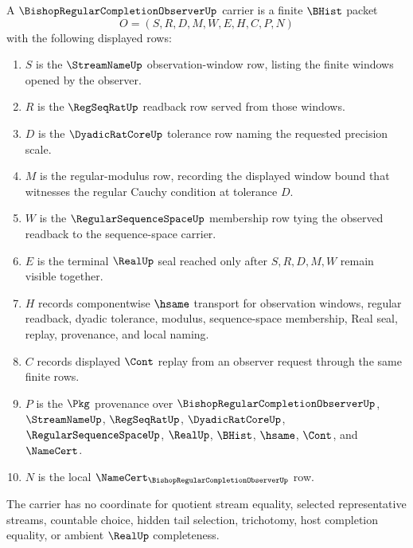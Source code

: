 \begin{definition}
\label{def:bishop-regular-completion-observer-carrier}
A $\BishopRegularCompletionObserverUp$ carrier is a finite $\BHist$ packet
$$
O=(S,R,D,M,W,E,H,C,P,N)
$$
with the following displayed rows:
\begin{enumerate}
\item $S$ is the $\StreamNameUp$ observation-window row, listing the finite windows opened by the observer.
\item $R$ is the $\RegSeqRatUp$ readback row served from those windows.
\item $D$ is the $\DyadicRatCoreUp$ tolerance row naming the requested precision scale.
\item $M$ is the regular-modulus row, recording the displayed window bound that witnesses the regular Cauchy condition at tolerance $D$.
\item $W$ is the $\RegularSequenceSpaceUp$ membership row tying the observed readback to the sequence-space carrier.
\item $E$ is the terminal $\RealUp$ seal reached only after $S,R,D,M,W$ remain visible together.
\item $H$ records componentwise $\hsame$ transport for observation windows, regular readback, dyadic tolerance, modulus, sequence-space membership, Real seal, replay, provenance, and local naming.
\item $C$ records displayed $\Cont$ replay from an observer request through the same finite rows.
\item $P$ is the $\Pkg$ provenance over $\BishopRegularCompletionObserverUp$, $\StreamNameUp$, $\RegSeqRatUp$, $\DyadicRatCoreUp$, $\RegularSequenceSpaceUp$, $\RealUp$, $\BHist$, $\hsame$, $\Cont$, and $\NameCert$.
\item $N$ is the local $\NameCert_{\BishopRegularCompletionObserverUp}$ row.
\end{enumerate}
The carrier has no coordinate for quotient stream equality, selected representative streams, countable choice, hidden tail selection, trichotomy, host completion equality, or ambient $\RealUp$ completeness.
\end{definition}

